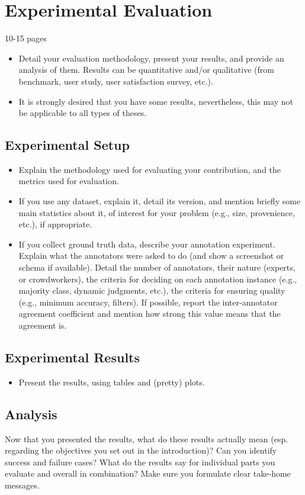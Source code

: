 
\chapter{Experimental Evaluation}
\label{ch:eval}
10-15 pages
\begin{itemize}
    \item Detail your evaluation methodology, present your results, and provide an analysis of them. Results can be quantitative and/or qualitative (from benchmark, user study, user satisfaction survey, etc.).
    \item It is strongly desired that you have some results, nevertheless, this may not be applicable to all types of theses.
\end{itemize}

\section{Experimental Setup}
\begin{itemize}
    \item Explain the methodology used for evaluating your contribution, and the metrics used for evaluation.
    \item If you use any dataset, explain it, detail its version, and mention briefly some main statistics about it, of interest for your problem (e.g., size, provenience, etc.), if appropriate.
    \item If you collect ground truth data, describe your annotation experiment. Explain what the annotators were asked to do (and show a screenshot or schema if available). Detail the number of annotators, their nature (experts, or crowdworkers), the criteria for deciding on each annotation instance (e.g., majority class, dynamic judgments, etc.), the criteria for ensuring quality (e.g., minimum accuracy, filters). If possible, report the inter-annotator agreement coefficient and mention how strong this value means that the agreement is.
\end{itemize}

\section{Experimental Results}
\begin{itemize}
    \item Present the results, using tables and (pretty) plots.
\end{itemize}

\section{Analysis}
Now that you presented the results, what do these results actually mean (esp. regarding the objectives you set out in the introduction)? Can you identify success and failure cases? What do the results say for individual parts you evaluate and overall in combination? Make sure you formulate clear take-home messages.

